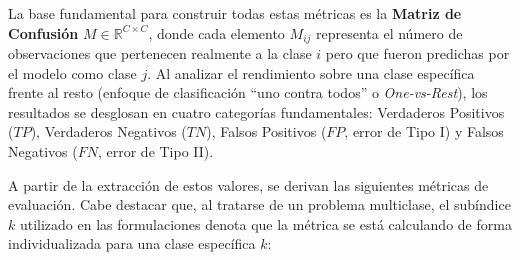 \documentclass[12pt, a4paper]{report}
\begin{document}
La base fundamental para construir todas estas métricas es la \textbf{Matriz de Confusión} $M \in \mathbb{R}^{C \times C}$, donde cada elemento $M_{ij}$ representa el número de observaciones que pertenecen realmente a la clase $i$ pero que fueron predichas por el modelo como clase $j$. Al analizar el rendimiento sobre una clase específica frente al resto (enfoque de clasificación ``uno contra todos'' o \textit{One-vs-Rest}), los resultados se desglosan en cuatro categorías fundamentales: Verdaderos Positivos ($TP$), Verdaderos Negativos ($TN$), Falsos Positivos ($FP$, error de Tipo I) y Falsos Negativos ($FN$, error de Tipo II).

A partir de la extracción de estos valores, se derivan las siguientes métricas de evaluación. Cabe destacar que, al tratarse de un problema multiclase, el subíndice $k$ utilizado en las formulaciones denota que la métrica se está calculando de forma individualizada para una clase específica $k$:
\end{document}
